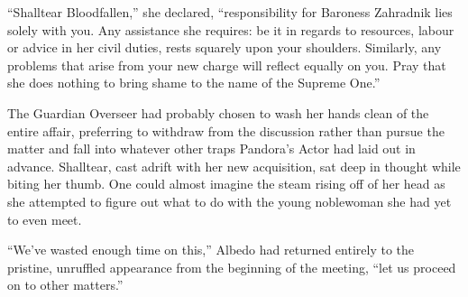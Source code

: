  

“Shalltear Bloodfallen,” she declared, “responsibility for Baroness Zahradnik lies solely with you. Any assistance she requires: be it in regards to resources, labour or advice in her civil duties, rests squarely upon your shoulders. Similarly, any problems that arise from your new charge will reflect equally on you. Pray that she does nothing to bring shame to the name of the Supreme One.”

 

The Guardian Overseer had probably chosen to wash her hands clean of the entire affair, preferring to withdraw from the discussion rather than pursue the matter and fall into whatever other traps Pandora’s Actor had laid out in advance. Shalltear, cast adrift with her new acquisition, sat deep in thought while biting her thumb. One could almost imagine the steam rising off of her head as she attempted to figure out what to do with the young noblewoman she had yet to even meet.

 

“We’ve wasted enough time on this,” Albedo had returned entirely to the pristine, unruffled appearance from the beginning of the meeting, “let us proceed on to other matters.”